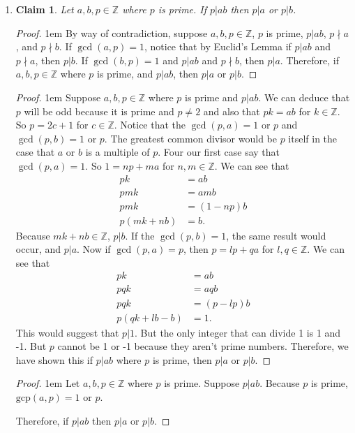 \documentclass[12 pt]{article}
\newcommand{\Z}{\mathbb{Z}}
\theoremstyle{definition}
\theoremstyle{plain}
\theoremstyle{mytheorem}
\newtheorem{claim}{Claim}
\theoremstyle{myexample}
\theoremstyle{mydefinition}
\begin{document}
\begin{enumerate}
\item \begin{claim}  Let $a,b, p \in \Z$ where $p$ is prime.  If $p|ab$ then $p|a$ or $p|b$.
\end{claim}

\begin{proof} \openup 1em
By way of contradiction, suppose $a,b,p \in \Z$, $p$ is prime, $p|ab$, $p \nmid a$, and $p \nmid b$.  If $\gcd(a,p)=1$, notice that by Euclid's Lemma if $p|ab$ and $p \nmid a$, then $p|b$.  If $\gcd(b,p)=1$ and $p|ab$ and $p \nmid b$, then $p|a$.  Therefore, if $a,b,p \in \Z$ where $p$ is prime, and $p|ab$, then $p|a$ or $p|b$.
\end{proof}

\begin{proof} \openup 1em
Suppose $a,b,p \in \Z$ where $p$ is prime and $p|ab$.  We can deduce that $p$ will be odd because it is prime and $p \neq 2$ and also that $pk=ab$ for $k \in \Z$.  So $p=2c+1$ for $c \in \Z$.  Notice that the $\gcd(p,a)=1$ or $p$ and $\gcd(p,b)=1$ or $p$.  The greatest common divisor would be $p$ itself in the case that $a$ or $b$ is a multiple of $p$.  Four our first case say that $\gcd(p,a)=1$.  So $1=np+ma$ for $n,m \in \Z$.  We can see that
	\begin{align*}
	pk &= ab\\
	pmk &=amb\\
	pmk &= (1-np)b \\
	p(mk+nb) &=b.
	\end{align*}
Because $mk+nb \in \Z$, $p|b$.  If the $\gcd(p,b)=1$, the same result would occur, and $p|a$.  Now if $\gcd(p,a)=p$, then $p=lp+qa$ for $l,q \in \Z$.  We can see that 
	\begin{align*}
	pk &=ab\\
	pqk &=aqb\\
	pqk &= (p-lp)b\\
	p(qk+lb-b) &= 1.
	\end{align*}
This would suggest that $p|1$.  But the only integer that can divide 1 is 1 and -1.  But $p$ cannot be 1 or -1 because they aren't prime numbers.  Therefore, we have shown this if $p|ab$ where $p$ is prime, then $p|a$ or $p|b$.
\end{proof}

\begin{proof} \openup 1em  Let $a,b,p \in \Z$ where $p$ is prime.  Suppose $p|ab$.  Because $p$ is prime, $\mbox{gcp}(a,p) =1 $ or $p$.
Therefore, if $p|ab$ then $p|a$ or $p|b$.
\end{proof}
\end{enumerate}
\end{document}
